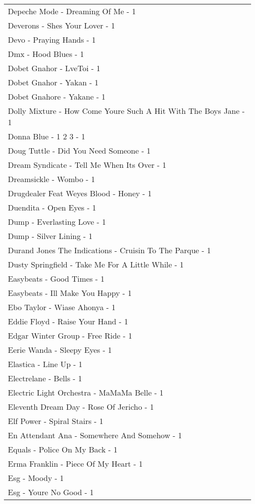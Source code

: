 \documentclass[
]{article}
\begin{document}
\begin{longtable}{l}
Depeche Mode - Dreaming Of Me - 1 \\ 
Deverons - Shes Your Lover - 1 \\ 
Devo - Praying Hands - 1 \\ 
Dmx - Hood Blues - 1 \\ 
Dobet Gnahor - LveToi - 1 \\ 
Dobet Gnahor - Yakan - 1 \\ 
Dobet Gnahore - Yakane - 1 \\ 
Dolly Mixture - How Come Youre Such A Hit With The Boys Jane - 1 \\ 
Donna Blue - 1 2 3 - 1 \\ 
Doug Tuttle - Did You Need Someone - 1 \\ 
Dream Syndicate - Tell Me When Its Over - 1 \\ 
Dreamsickle - Wombo - 1 \\ 
Drugdealer Feat Weyes Blood - Honey - 1 \\ 
Duendita - Open Eyes - 1 \\ 
Dump - Everlasting Love - 1 \\ 
Dump - Silver Lining - 1 \\ 
Durand Jones The Indications - Cruisin To The Parque - 1 \\ 
Dusty Springfield - Take Me For A Little While - 1 \\ 
Easybeats - Good Times - 1 \\ 
Easybeats - Ill Make You Happy - 1 \\ 
Ebo Taylor - Wiase Ahonya - 1 \\ 
Eddie Floyd - Raise Your Hand - 1 \\ 
Edgar Winter Group - Free Ride - 1 \\ 
Eerie Wanda - Sleepy Eyes - 1 \\ 
Elastica - Line Up - 1 \\ 
Electrelane - Bells - 1 \\ 
Electric Light Orchestra - MaMaMa Belle - 1 \\ 
Eleventh Dream Day - Rose Of Jericho - 1 \\ 
Elf Power - Spiral Stairs - 1 \\ 
En Attendant Ana - Somewhere And Somehow - 1 \\ 
Equals - Police On My Back - 1 \\ 
Erma Franklin - Piece Of My Heart - 1 \\ 
Esg - Moody - 1 \\ 
Esg - Youre No Good - 1 \\ 

\end{longtable}
\end{document}
